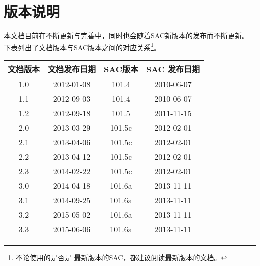 {\section*{版本说明}}

本文档目前在不断更新与完善中，同时也会随着SAC新版本的发布而不断更新。
下表列出了文档版本与SAC版本之间的对应关系\footnote{不论使用的是否是
最新版本的SAC，都建议阅读最新版本的文档。}。

\begin{table}[H]
\centering
\begin{tabular}{cccc}
\toprule
文档版本	& 	文档发布日期 	& 	SAC版本 &	SAC 发布日期\\
\midrule
1.0  			&	2012-01-08		&	101.4	&	2010-06-07	\\
1.1  			&	2012-09-03		&	101.4	&	2010-06-07	\\
1.2  			&	2012-09-18		&	101.5	&	2011-11-15	\\
2.0  			&	2013-03-29		&	101.5c	&	2012-02-01	\\
2.1  			&	2013-04-06		&	101.5c	&	2012-02-01	\\
2.2  			&	2013-04-12		&	101.5c	&	2012-02-01	\\
2.3             &   2014-02-22      &   101.5c  &   2012-02-01  \\
3.0             &   2014-04-18      &   101.6a  &   2013-11-11  \\
3.1             &   2014-09-25      &   101.6a  &   2013-11-11  \\
3.2             &   2015-05-02      &   101.6a  &   2013-11-11  \\
3.3             &   2015-06-06      &   101.6a  &   2013-11-11  \\
\bottomrule
\end{tabular}
\end{table}
